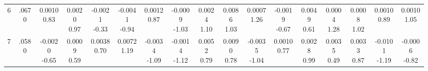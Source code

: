 \begin{landscape}
\begin{center}
{\begin{adjustbox}{max width=\textheight}
\begin{tabular}{lcccccccccccccccc}
6 & .0670 & \shortstack{0.0010\\0.83} & \shortstack{0.0020\\0.97} & \shortstack{-0.0021\\-0.33} & \shortstack{-0.0041\\-0.94} & \shortstack{0.0012\\0.87} & \shortstack{-0.0009\\-1.03} & \shortstack{0.0024\\1.10} & \shortstack{0.0086\\1.03} & \shortstack{0.0007\\1.26} & \shortstack{-0.0019\\-0.67} & \shortstack{0.0049\\0.61} & \shortstack{0.0004\\1.28} & \shortstack{0.0008\\1.02} & \shortstack{0.0010\\0.89} & \shortstack{0.0010\\1.05} \\
7 & .0580 & \shortstack{-0.0020\\-0.65} & \shortstack{0.0009\\0.59} & \shortstack{0.0038\\0.70} & \shortstack{0.0072\\1.19} & \shortstack{-0.0034\\-1.09} & \shortstack{-0.0014\\-1.12} & \shortstack{0.0052\\0.79} & \shortstack{0.0090\\0.78} & \shortstack{-0.0035\\-1.04} & \shortstack{0.0010\\0.77} & \shortstack{0.0028\\0.99} & \shortstack{0.0035\\0.49} & \shortstack{0.0033\\0.87} & \shortstack{-0.0101\\-1.19} & \shortstack{-0.0006\\-0.82} \\

\end{tabular}
\end{adjustbox}}
\end{center}
\end{landscape}

